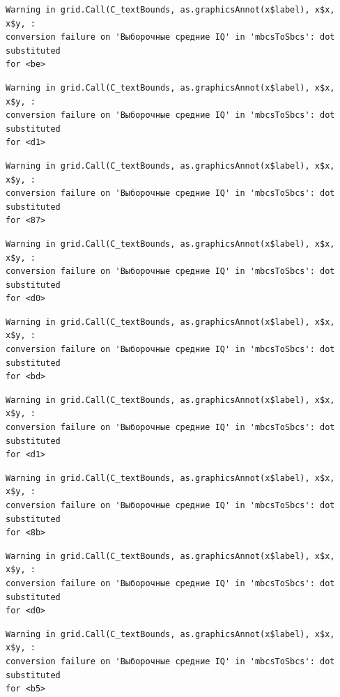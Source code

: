 \documentclass[
  letterpaper,
]{scrbook}
\theoremstyle{definition}
\theoremstyle{remark}
\begin{document}
\begin{verbatim}
Warning in grid.Call(C_textBounds, as.graphicsAnnot(x$label), x$x, x$y, :
conversion failure on 'Выборочные средние IQ' in 'mbcsToSbcs': dot substituted
for <be>
\end{verbatim}

\begin{verbatim}
Warning in grid.Call(C_textBounds, as.graphicsAnnot(x$label), x$x, x$y, :
conversion failure on 'Выборочные средние IQ' in 'mbcsToSbcs': dot substituted
for <d1>
\end{verbatim}

\begin{verbatim}
Warning in grid.Call(C_textBounds, as.graphicsAnnot(x$label), x$x, x$y, :
conversion failure on 'Выборочные средние IQ' in 'mbcsToSbcs': dot substituted
for <87>
\end{verbatim}

\begin{verbatim}
Warning in grid.Call(C_textBounds, as.graphicsAnnot(x$label), x$x, x$y, :
conversion failure on 'Выборочные средние IQ' in 'mbcsToSbcs': dot substituted
for <d0>
\end{verbatim}

\begin{verbatim}
Warning in grid.Call(C_textBounds, as.graphicsAnnot(x$label), x$x, x$y, :
conversion failure on 'Выборочные средние IQ' in 'mbcsToSbcs': dot substituted
for <bd>
\end{verbatim}

\begin{verbatim}
Warning in grid.Call(C_textBounds, as.graphicsAnnot(x$label), x$x, x$y, :
conversion failure on 'Выборочные средние IQ' in 'mbcsToSbcs': dot substituted
for <d1>
\end{verbatim}

\begin{verbatim}
Warning in grid.Call(C_textBounds, as.graphicsAnnot(x$label), x$x, x$y, :
conversion failure on 'Выборочные средние IQ' in 'mbcsToSbcs': dot substituted
for <8b>
\end{verbatim}

\begin{verbatim}
Warning in grid.Call(C_textBounds, as.graphicsAnnot(x$label), x$x, x$y, :
conversion failure on 'Выборочные средние IQ' in 'mbcsToSbcs': dot substituted
for <d0>
\end{verbatim}

\begin{verbatim}
Warning in grid.Call(C_textBounds, as.graphicsAnnot(x$label), x$x, x$y, :
conversion failure on 'Выборочные средние IQ' in 'mbcsToSbcs': dot substituted
for <b5>
\end{verbatim}
\end{document}
